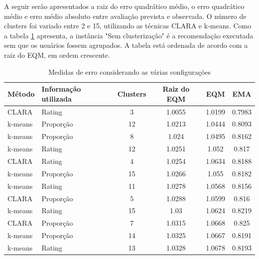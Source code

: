 \documentclass[12pt,a4paper,header]{abnt}
\begin{document}
A seguir serão apresentados a raiz do erro quadrático médio, o erro quadrático médio e erro médio absoluto entre avaliação prevista e observada. O número de clusters foi variado entre 2 e 15, utilizando as técnicas CLARA e k-means. Como a tabela \ref{erros_rec} apresenta, a instância "Sem clusterização" é a recomendação executada sem que os usuários fossem agrupados. A tabela está ordenada de acordo com a raiz do EQM, em ordem crescente.

\begin{longtable}{@{}llcccc@{}}
\caption{Medidas de erro considerando as várias configurações}
\label{erros_rec}
\\
\toprule
\textbf{Método}   & \textbf{Informação utilizada}   & \textbf{Clusters}   & \textbf{Raiz do EQM}     & \textbf{EQM}             & \textbf{EMA}             \\* \midrule
\endhead
%
\bottomrule
\endfoot
%
\endlastfoot
%
CLARA    & Rating                 & 3          & 1.0055          & 1.0199          & 0.7983          \\
k-means   & Proporção              & 12         & 1.0213          & 1.0444          & 0.8093          \\
k-means   & Proporção              & 8          & 1.024           & 1.0495          & 0.8162          \\
k-means   & Rating                 & 12         & 1.0251          & 1.052           & 0.817           \\
CLARA    & Rating                 & 4          & 1.0254          & 1.0634          & 0.8188          \\
k-means   & Proporção              & 15         & 1.0266          & 1.055           & 0.8182          \\
k-means   & Rating                 & 11         & 1.0278          & 1.0568          & 0.8156          \\
CLARA    & Proporção              & 5          & 1.0288          & 1.0599          & 0.816           \\
k-means   & Rating                 & 15         & 1.03            & 1.0624          & 0.8219          \\
CLARA    & Proporção              & 7          & 1.0315          & 1.0668          & 0.825           \\
k-means   & Proporção              & 14         & 1.0325          & 1.0667          & 0.8191          \\
k-means   & Rating                 & 13         & 1.0328          & 1.0678          & 0.8193          \\

\end{longtable}
\end{document}
